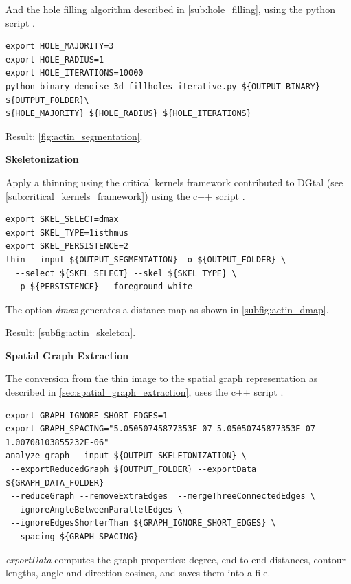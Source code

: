 And the hole filling algorithm described in \autoref{sub:hole_filling},
using the python script   \cite{phcerdan_binary_denoise_3d_fillholes_iterative_2018}.

\begin{verbatim}
export HOLE_MAJORITY=3
export HOLE_RADIUS=1
export HOLE_ITERATIONS=10000
python binary_denoise_3d_fillholes_iterative.py ${OUTPUT_BINARY} ${OUTPUT_FOLDER}\
${HOLE_MAJORITY} ${HOLE_RADIUS} ${HOLE_ITERATIONS}
\end{verbatim}

Result: \autoref{fig:actin_segmentation}.

\textbf{Skeletonization}

Apply a thinning using the critical kernels framework contributed to DGtal (see \autoref{sub:critical_kernels_framework})
using the c++ script  \citetitle*{phcerdan_thin_2018} \cite{phcerdan_thin_2018}.

\begin{verbatim}
export SKEL_SELECT=dmax
export SKEL_TYPE=1isthmus
export SKEL_PERSISTENCE=2
thin --input ${OUTPUT_SEGMENTATION} -o ${OUTPUT_FOLDER} \
  --select ${SKEL_SELECT} --skel ${SKEL_TYPE} \
  -p ${PERSISTENCE} --foreground white
\end{verbatim}

The option \textit{dmax} generates a distance map as shown in \autoref{subfig:actin_dmap}.

Result: \autoref{subfig:actin_skeleton}.

\textbf{Spatial Graph Extraction}

The conversion from the thin image to the spatial graph representation as described in \autoref{sec:spatial_graph_extraction},
uses the c++ script   \cite{phcerdan_analyze_graph_2018}.

\begin{verbatim}
export GRAPH_IGNORE_SHORT_EDGES=1
export GRAPH_SPACING="5.05050745877353E-07 5.05050745877353E-07 1.00708103855232E-06"
analyze_graph --input ${OUTPUT_SKELETONIZATION} \
 --exportReducedGraph ${OUTPUT_FOLDER} --exportData ${GRAPH_DATA_FOLDER}
 --reduceGraph --removeExtraEdges  --mergeThreeConnectedEdges \
 --ignoreAngleBetweenParallelEdges \
 --ignoreEdgesShorterThan ${GRAPH_IGNORE_SHORT_EDGES} \
 --spacing ${GRAPH_SPACING}
\end{verbatim}

\textit{exportData} computes the graph properties: degree, end-to-end distances, contour lengths, angle and direction cosines, and saves them into a file.

